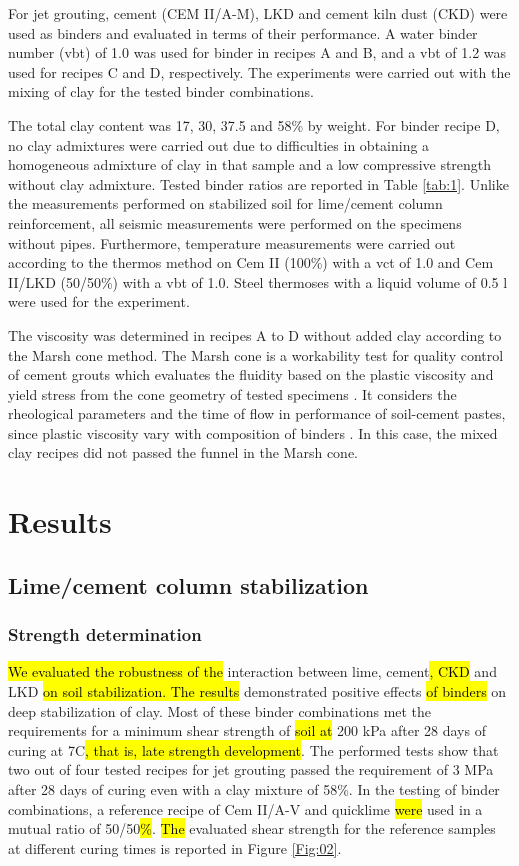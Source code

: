 \documentclass[USenglish,twocolumn]{article}
\begin{document}
For jet grouting, cement (CEM II/A-M), LKD and cement kiln dust (CKD) were used as binders and evaluated in terms of their performance. A water binder number (vbt) of 1.0 was used for binder in recipes A and B, and a vbt of 1.2 was used for recipes C and D, respectively. The experiments were carried out with the mixing of clay for the tested binder combinations. 

The total clay content was 17, 30, 37.5 and 58\% by weight. For binder recipe D, no clay admixtures were carried out due to difficulties in obtaining a homogeneous admixture of clay in that sample and a low compressive strength without clay admixture. Tested binder ratios are reported in Table \ref{tab:1}. Unlike the measurements performed on stabilized soil for lime/cement column reinforcement, all seismic measurements were performed on the specimens without pipes. Furthermore, temperature measurements were carried out according to the thermos method on Cem II (100\%) with a vct of 1.0 and Cem II/LKD (50/50\%) with a vbt of 1.0. Steel thermoses with a liquid volume of 0.5 l were used for the experiment.

The viscosity was determined in recipes A to D without added clay according to the Marsh cone method. The Marsh cone is a workability test for quality control of cement grouts which evaluates the fluidity based on the plastic viscosity and yield stress from the cone geometry of tested specimens \cite{ROUSSEL2005823}. It considers the rheological parameters and the time of flow in performance of soil-cement pastes, since plastic viscosity vary with composition of binders \cite{Banfill,FERRARIS2001245}. In this case, the mixed clay recipes did not passed the funnel in the Marsh cone. 

\section{Results}

\subsection{Lime/cement column stabilization}
\subsubsection{Strength determination}
\hl{We evaluated the robustness of the }interaction between lime, cement\hl{, CKD }and LKD \hl{on soil stabilization. The results} demonstrated positive effects \hl{of binders }on deep stabilization of clay. Most of these binder combinations met the requirements for a minimum shear strength of \hl{soil at} 200 kPa after 28 days of curing at 7\degree C\hl{, that is, late strength development}. The performed tests show that two out of four tested recipes for jet grouting passed the requirement of 3 MPa after 28 days of curing even with a clay mixture of 58\%. In the testing of binder combinations, a reference recipe of Cem II/A-V and quicklime \hl{were} used in a mutual ratio of 50/50\hl{\%}. \hl{The }evaluated shear strength for the reference samples at different curing times is reported in Figure \ref{Fig:02}.
\end{document}
